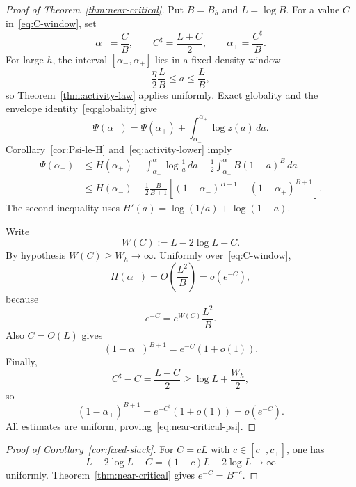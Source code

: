 \documentclass[11pt]{amsart}
\theoremstyle{definition}
\begin{document}
\begin{proof}[Proof of Theorem~\ref{thm:near-critical}]
Put $B=B_h$ and $L=\log B$.  For a value $C$ in~\eqref{eq:C-window}, set
\[
 \alpha_- =\frac CB,
 \qquad
 C^\sharp=\frac{L+C}{2},
 \qquad
 \alpha_+=\frac{C^\sharp}{B}.
\]
For large $h$, the interval $[\alpha_-,\alpha_+]$ lies in a fixed density window
\[
 \frac\eta2\frac LB
 \le a\le
 \frac LB,
\]
so Theorem~\ref{thm:activity-law} applies uniformly.  Exact globality and the envelope identity~\eqref{eq:globality} give
\[
 \Psi(\alpha_-)
 =\Psi(\alpha_+)+\int_{\alpha_-}^{\alpha_+}\log z(a)\,da.
\]
Corollary~\ref{cor:Psi-le-H} and~\eqref{eq:activity-lower} imply
\begin{align*}
 \Psi(\alpha_-)
 &\le H(\alpha_+)
 -\int_{\alpha_-}^{\alpha_+}\log\frac1a\,da
 -\frac12\int_{\alpha_-}^{\alpha_+}B(1-a)^B\,da\\
 &\le H(\alpha_-)
 -\frac12\frac{B}{B+1}
 \left[(1-\alpha_-)^{B+1}-(1-\alpha_+)^{B+1}\right].
\end{align*}
The second inequality uses $H'(a)=\log(1/a)+\log(1-a)$.

Write
\[
 W(C):=L-2\log L-C.
\]
By hypothesis $W(C)\ge W_h\to\infty$.  Uniformly over~\eqref{eq:C-window},
\[
 H(\alpha_-)=O\left(\frac{L^2}{B}\right)
 =o(e^{-C}),
\]
because
\[
 e^{-C}=e^{W(C)}\frac{L^2}{B}.
\]
Also $C=O(L)$ gives
\[
 (1-\alpha_-)^{B+1}=e^{-C}(1+o(1)).
\]
Finally,
\[
 C^\sharp-C=\frac{L-C}{2}
 \ge\log L+\frac{W_h}{2},
\]
so
\[
 (1-\alpha_+)^{B+1}
 =e^{-C^\sharp}(1+o(1))
 =o(e^{-C}).
\]
All estimates are uniform, proving~\eqref{eq:near-critical-psi}.
\end{proof}

\begin{proof}[Proof of Corollary~\ref{cor:fixed-slack}]
For $C=cL$ with $c\in[c_-,c_+]$, one has
\[
 L-2\log L-C=(1-c)L-2\log L\to\infty
\]
uniformly.  Theorem~\ref{thm:near-critical} gives $e^{-C}=B^{-c}$.
\end{proof}
\end{document}
